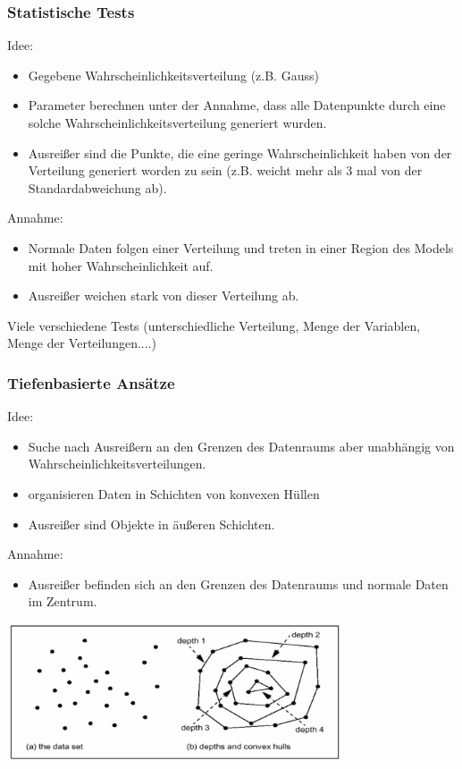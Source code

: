 \documentclass{article} %
\begin{document}
\subsubsection{Statistische Tests}
Idee:
\begin{itemize}
	\item Gegebene Wahrscheinlichkeitsverteilung (z.B. Gauss)
    \item Parameter berechnen unter der Annahme, dass alle Datenpunkte durch eine solche Wahrscheinlichkeitsverteilung generiert wurden.
    \item Ausreißer sind die Punkte, die eine geringe Wahrscheinlichkeit haben von der Verteilung generiert worden zu sein (z.B. weicht mehr als 3 mal von der Standardabweichung ab).
\end{itemize}
Annahme:
\begin{itemize}
	\item Normale Daten folgen einer Verteilung und treten in einer Region des Models mit hoher Wahrscheinlichkeit auf.
    \item Ausreißer weichen stark von dieser Verteilung ab.
\end{itemize}
Viele verschiedene Tests (unterschiedliche Verteilung, Menge der Variablen, Menge der Verteilungen....)\\
\subsubsection{Tiefenbasierte Ansätze}
Idee:
\begin{itemize}
	\item Suche nach Ausreißern an den Grenzen des Datenraums aber unabhängig von Wahrscheinlichkeitsverteilungen.
    \item organisieren Daten in Schichten von konvexen Hüllen
    \item Ausreißer sind Objekte in äußeren Schichten.
\end{itemize}
Annahme:
\begin{itemize}
	\item Ausreißer befinden sich an den Grenzen des Datenraums und normale Daten im Zentrum.
\end{itemize}
\begin{center}
	\includegraphics[width=10cm]{img/depth.png}
\end{center}
\end{document}
